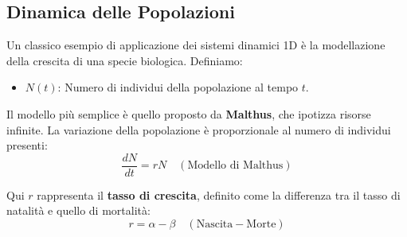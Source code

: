 \documentclass[openany]{book}
\theoremstyle{definition}
\theoremstyle{remark}
\begin{document}
\begin{center}
\end{center}




\subsection{Dinamica delle Popolazioni}
Un classico esempio di applicazione dei sistemi dinamici 1D è la modellazione della crescita di una specie biologica.
Definiamo:
\begin{itemize}
    \item $N(t)$: Numero di individui della popolazione al tempo $t$.
\end{itemize}

Il modello più semplice è quello proposto da \textbf{Malthus}, che ipotizza risorse infinite. La variazione della popolazione è proporzionale al numero di individui presenti:
\begin{equation}
    \frac{dN}{dt} = r N \quad (\text{Modello di Malthus})
\end{equation}

Qui $r$ rappresenta il \textbf{tasso di crescita}, definito come la differenza tra il tasso di natalità e quello di mortalità:
\[ r = \alpha - \beta \quad (\text{Nascita} - \text{Morte}) \]
\end{document}
